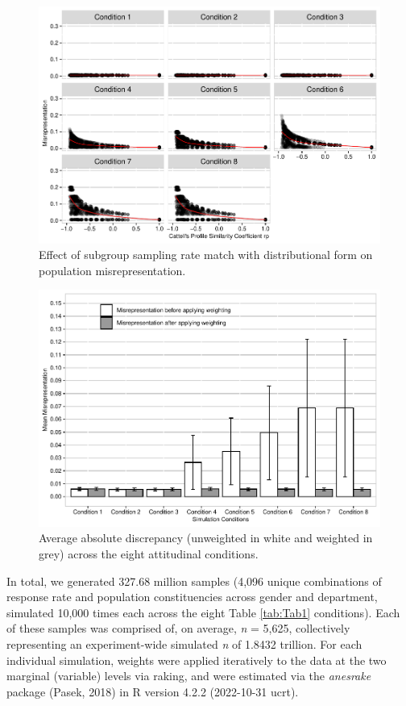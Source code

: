 \documentclass[
  man,mask]{apa7}
\begin{document}
\begin{figure}
\centering
\includegraphics{Simulation-paper2-20200207_files/figure-latex/Cattell3-1.pdf}
\caption{\label{fig:Cattell3}Effect of subgroup sampling rate match with distributional form on population misrepresentation.}
\end{figure}

\begin{figure}
\centering
\includegraphics{Simulation-paper2-20200207_files/figure-latex/Overall4-1.pdf}
\caption{\label{fig:Overall4}Average absolute discrepancy (unweighted in white and weighted in grey) across the eight attitudinal conditions.}
\end{figure}

In total, we generated 327.68 million samples (4,096 unique combinations of response rate and population constituencies across gender and department, simulated 10,000 times each across the eight Table \ref{tab:Tab1} conditions). Each of these samples was comprised of, on average, \emph{n} = 5,625, collectively representing an experiment-wide simulated \emph{n} of 1.8432 trillion. For each individual simulation, weights were applied iteratively to the data at the two marginal (variable) levels via raking, and were estimated via the \emph{anesrake} package (Pasek, 2018) in R version 4.2.2 (2022-10-31 ucrt).
\end{document}
